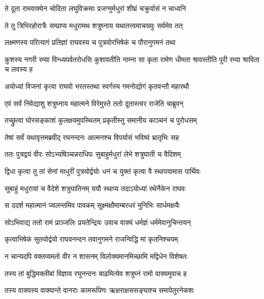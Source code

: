 
\twolineshloka
{ते दूता रामवाक्येन चोदिता लघुविक्रमाः}
{प्रजग्मुर्मधुरां शीघ्रं चक्रुर्वासं न चाध्वनि} %

\twolineshloka
{ते तु त्रिभिरहोरात्रैः सम्प्राप्य मधुरामथ}
{शत्रुघ्नाय यथातत्त्वमाचख्युः सर्वमेव तत्} %

\twolineshloka
{लक्ष्मणस्य परित्यागं प्रतिज्ञां राघवस्य च}
{पुत्रयोरभिषेकं च पौरानुगमनं तथा} %

\threelineshloka
{कुशस्य नगरी रम्या विन्ध्यपर्वतरोधसि}
{कुशावतीति नाम्ना सा कृता रामेण धीमता}
{श्रावस्तीति पुरी रम्या श्राविता च लवस्य ह} %

\twolineshloka
{अयोध्यां विजनां कृत्वा राघवो भरतस्तथा}
{स्वर्गस्य गमनोद्योगं कृतवन्तौ महारथौ} %

\twolineshloka
{एवं सर्वं निवेद्याशु शत्रुघ्नाय महात्मने}
{विरेमुस्ते ततो दूतास्त्वर राजेति चाब्रुवन्} %

\twolineshloka
{तच्छ्रुत्वा घोरसङ्काशं कुलक्षयमुपस्थितम्}
{प्रकृतीस्तु समानीय काञ्चनं च पुरोधसम्} %

\twolineshloka
{तेषां सर्वं यथावृत्तमब्रवीद् रघनन्दनः}
{आत्मनश्च विपर्यासं भविष्यं भ्रातृभिः सह} %

\twolineshloka
{ततः पुत्रद्वयं वीरः सोऽभ्यषिञ्चन्नराधिपः}
{सुबाहुर्मधुरां लेभे शत्रुघाती च वैदिशम्} %

\twolineshloka
{द्विधा कृत्वा तु तां सेनां माधुरीं पुत्रयोर्द्वयोः}
{धनं च युक्तं कृत्वा वै स्थापयामास पार्थिवः} %

\twolineshloka
{सुबाहुं मधुरायां च वैदेशे शत्रुघातिनम्}
{ययौ स्थाप्य तदाऽयोध्यां रथेनैकेन राघवः} %

\twolineshloka
{स ददर्श महात्मानं ज्वलन्तमिव पावकम्}
{सूक्ष्मक्षौमाम्बरधरं मुनिभिः सार्धमक्षयैः} %

\twolineshloka
{सोऽभिवाद्य ततो रामं प्राञ्जलिः प्रयतेन्द्रियः}
{उवाच वाक्यं धर्मज्ञं धर्ममेवानुचिन्तयन्} %

\twolineshloka
{कृत्वाभिषेकं सुतयोर्द्वयो राघवनन्दन}
{तवानुगमने राजन्विद्धि मां कृतनिश्चयम्} %

\twolineshloka
{न चान्यदपि वक्तव्यमतो वीर न शासनम्}
{विलोक्यमानमिच्छामि मद्विधेन विशेषतः} %

\twolineshloka
{तस्य तां बुद्धिमक्लीबां विज्ञाय रघुनन्दनः}
{बाढमित्येव शत्रुघ्नं रामो वाक्यमुवाच ह} %

\twolineshloka
{तस्य वाक्यस्य वाक्यान्ते वानराः कामरूपिणः}
{ऋक्षराक्षससङ्घाश्च समापेतुरनेकशः} %

